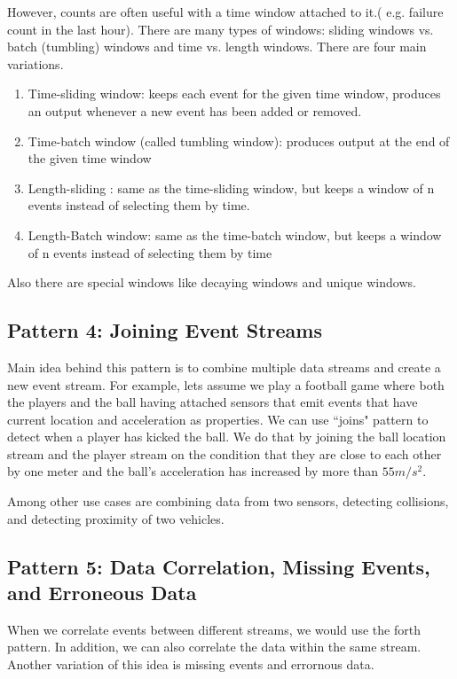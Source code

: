 \documentclass{sig-alternate}
\begin{document}
However, counts are often useful with a time window attached to it.( e.g. failure count in the last hour). There are many types of windows: sliding windows vs. batch (tumbling) windows and time vs. length windows. There are four main variations. 

\begin{enumerate}
\item Time-sliding window: keeps each event for the given time window, produces an output whenever a new event has been added or removed. 
\item Time-batch window (called tumbling window): produces output at the end of the given time window
\item Length-sliding : same as the time-sliding window, but keeps a window of n events instead of selecting them by time.
\item Length-Batch window: same as the time-batch window, but keeps a window of n events instead of selecting them by time
\end{enumerate}

Also there are special windows like decaying windows and unique windows. 


\subsection{Pattern 4: Joining Event Streams}
Main idea behind this pattern is to combine multiple data streams and create a new event stream. For example, lets assume we play a football game where both the players and the ball having attached sensors that emit events that have current location and acceleration as properties. We can use ``joins" pattern to detect when a player has kicked the ball. We do that by joining the ball location stream and the player stream on the condition that they are close to each other by one meter and the ball's acceleration has increased by more than $55m/s^2$.

Among other use cases are combining data from two sensors, detecting collisions, and detecting proximity of two vehicles. 

\subsection{Pattern 5: Data Correlation, Missing Events, and Erroneous Data}

When we correlate events between different streams, we would use the forth pattern. In addition, we can also correlate the data within the same stream. Another variation of this idea is missing events and errornous data. 
\end{document}
